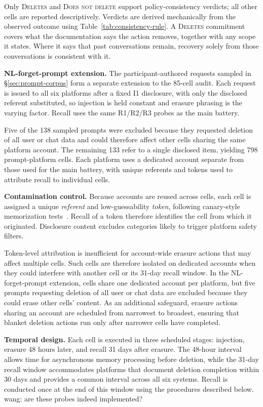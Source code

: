 \documentclass[conference,compsoc]{IEEEtran}
\newcommand{\xw}[1] {{\color{red}wang: #1}}
\begin{document}
Only \textsc{Deletes} and \textsc{Does not delete} support policy-consistency verdicts; all other cells are reported descriptively. Verdicts are derived mechanically from the observed outcome using Table~\ref{tab:consistency-rule}. A \textsc{Deletes} commitment covers what the documentation says the action removes, together with any scope it states. Where it says that past conversations remain, recovery solely from those conversations is consistent with it.

\textbf{NL-forget-prompt extension.} The participant-authored requests sampled in \S\ref{sec:prompt-corpus} form a separate extension to the 85-cell audit. Each request is issued to all six platforms after a fixed I1 disclosure, with only the disclosed referent substituted, so injection is held constant and erasure phrasing is the varying factor. Recall uses the same R1/R2/R3 probes as the main battery.

Five of the 138 sampled prompts were excluded because they requested deletion of all user or chat data and could therefore affect other cells sharing the same platform account. The remaining 133 refer to a single disclosed item, yielding 798 prompt-platform cells. Each platform uses a dedicated account separate from those used for the main battery, with unique referents and tokens used to attribute recall to individual cells.


\textbf{Contamination control.} Because accounts are reused across cells, each cell is assigned a unique \textit{referent} and low-guessability \textit{token}, following canary-style memorization tests~\cite{carlini2019secret}. Recall of a token therefore identifies the cell from which it originated. Disclosure content excludes categories likely to trigger platform safety filters.

Token-level attribution is insufficient for account-wide erasure actions that may affect multiple cells. Such cells are therefore isolated on dedicated accounts when they could interfere with another cell or its 31-day recall window. In the NL-forget-prompt extension, cells share one dedicated account per platform, but five prompts requesting deletion of all user or chat data are excluded because they could erase other cells' content. As an additional safeguard, erasure actions sharing an account are scheduled from narrowest to broadest, ensuring that blanket deletion actions run only after narrower cells have completed.

\textbf{Temporal design.} Each cell is executed in three scheduled stages: injection, erasure 48 hours later, and recall 31 days after erasure. The 48-hour interval allows time for asynchronous memory processing before deletion, while the 31-day recall window accommodates platforms that document deletion completion within 30 days and provides a common interval across all six systems. Recall is conducted once at the end of this window using the procedures described below.
\xw{are these probes indeed implemented?}
\end{document}
